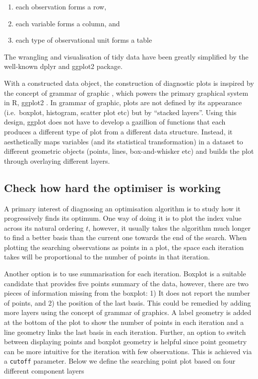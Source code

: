 \documentclass[12pt]{article}
\providecommand{\tightlist}{%
  \setlength{\itemsep}{0pt}\setlength{\parskip}{0pt}}
\begin{document}
\begin{enumerate}
\def\labelenumi{\arabic{enumi})}
\tightlist
\item
  each observation forms a row,
\item
  each variable forms a column, and
\item
  each type of observational unit forms a table
\end{enumerate}

The wrangling and visualisation of tidy data have been greatly
simplified by the well-known dplyr\citep{dplyr} and
ggplot2\citep{ggplot2} package.

With a constructed data object, the construction of diagnostic plots is
inspired by the concept of grammar of graphic
\citep{wickham2010layered}, which powers the primary graphical system in
R, ggplot2 \citep{ggplot2}. In grammar of graphic, plots are not defined
by its appearance (i.e.~boxplot, histogram, scatter plot etc) but by
``stacked layers''. Using this design, ggplot does not have to develop a
gazillion of functions that each produces a different type of plot from
a different data structure. Instead, it aesthetically maps variables
(and its statistical transformation) in a dataset to different geometric
objects (points, lines, box-and-whisker etc) and builds the plot through
overlaying different layers.

\hypertarget{check-how-hard-the-optimiser-is-working}{%
\subsection{Check how hard the optimiser is
working}\label{check-how-hard-the-optimiser-is-working}}

A primary interest of diagnosing an optimisation algorithm is to study
how it progressively finds its optimum. One way of doing it is to plot
the index value across its natural ordering \(t\), however, it usually
takes the algorithm much longer to find a better basis than the current
one towards the end of the search. When plotting the searching
observations as points in a plot, the space each iteration takes will be
proportional to the number of points in that iteration.

Another option is to use summarisation for each iteration. Boxplot is a
suitable candidate that provides five points summary of the data,
however, there are two pieces of information missing from the boxplot:
1) It does not report the number of points, and 2) the position of the
last basis. This could be remedied by adding more layers using the
concept of grammar of graphics. A label geometry is added at the bottom
of the plot to show the number of points in each iteration and a line
geometry links the last basis in each iteration. Further, an option to
switch between displaying points and boxplot geometry is helpful since
point geometry can be more intuitive for the iteration with few
observations. This is achieved via a \texttt{cutoff} parameter. Below we
define the searching point plot based on four different component layers
\end{document}
